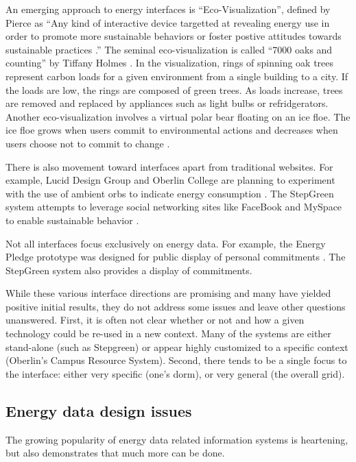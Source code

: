 An emerging approach to energy interfaces is ``Eco-Visualization'',
defined by Pierce as ``Any kind of interactive device targetted at
revealing energy use in order to promote more sustainable behaviors or
foster postive attitudes towards sustainable practices \cite{Pierce08}.''
The seminal eco-visualization is called ``7000 oaks and counting'' by
Tiffany Holmes \cite{Holmes07}.  In the visualization, rings of spinning
oak trees represent carbon loads for a given environment from a single
building to a city.  If the loads are low, the rings are composed of green
trees. As loads increase, trees are removed and replaced by appliances such
as light bulbs or refridgerators.  Another eco-visualization involves a
virtual polar bear floating on an ice floe. The ice floe grows when users
commit to environmental actions and decreases when users choose not to
commit to change \cite{Dillahunt08}.

There is also movement toward interfaces apart from traditional websites.
For example, Lucid Design Group and Oberlin College are planning to
experiment with the use of ambient orbs to indicate energy consumption
\cite{Peterson09}.  The StepGreen system attempts to leverage social
networking sites like FaceBook and MySpace to enable sustainable behavior
\cite{Mankoff07}.

Not all interfaces focus exclusively on energy data.  For example, the
Energy Pledge prototype was designed for public display of personal
commitments \cite{Pierce09}.  The StepGreen system also provides a display
of commitments.  

While these various interface directions are promising and many have
yielded positive initial results, they do not address some issues and leave
other questions unanswered. First, it is often not clear whether or not and
how a given technology could be re-used in a new context.  Many of the
systems are either stand-alone (such as Stepgreen) or appear highly
customized to a specific context (Oberlin's Campus Resource
System). Second, there tends to be a single focus to the interface: either
very specific (one's dorm), or very general (the overall grid).  

\subsection{Energy data design issues}

The growing popularity of energy data related information systems is
heartening, but also demonstrates that much more can be done. 


